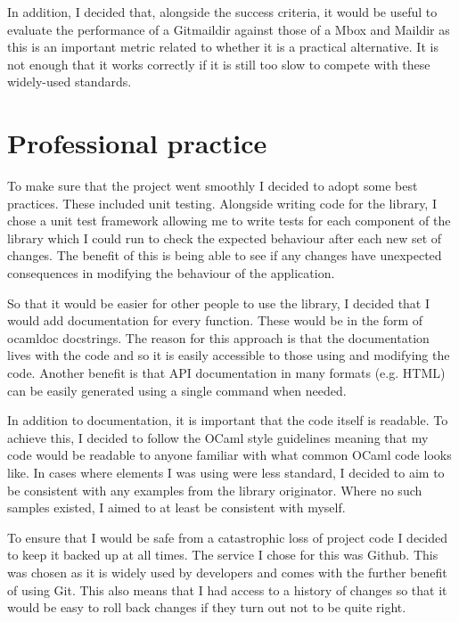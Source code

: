 In addition, I decided that, alongside the success criteria, it would be useful to evaluate the performance of a Gitmaildir against those of a Mbox and Maildir as this is an important metric related to whether it is a practical alternative. It is not enough that it works correctly if it is still too slow to compete with these widely-used standards.

\section{Professional practice}

To make sure that the project went smoothly I decided to adopt some best practices. These included unit testing. Alongside writing code for the library, I chose a unit test framework allowing me to write tests for each component of the library which I could run to check the expected behaviour after each new set of changes. The benefit of this is being able to see if any changes have unexpected consequences in modifying the behaviour of the application.

So that it would be easier for other people to use the library, I decided that I would add documentation for every function. These would be in the form of ocamldoc docstrings. The reason for this approach is that the documentation lives with the code and so it is easily accessible to those using and modifying the code. Another benefit is that API documentation in many formats (e.g. HTML) can be easily generated using a single command when needed.

In addition to documentation, it is important that the code itself is readable. To achieve this, I decided to follow the OCaml style guidelines\cite{ocaml_guidelines} meaning that my code would be readable to anyone familiar with what common OCaml code looks like. In cases where elements I was using were less standard, I decided to aim to be consistent with any examples from the library originator. Where no such samples existed, I aimed to at least be consistent with myself.

To ensure that I would be safe from a catastrophic loss of project code I decided to keep it backed up at all times. The service I chose for this was Github. This was chosen as it is widely used by developers and comes with the further benefit of using Git. This also means that I had access to a history of changes so that it would be easy to roll back changes if they turn out not to be quite right.
